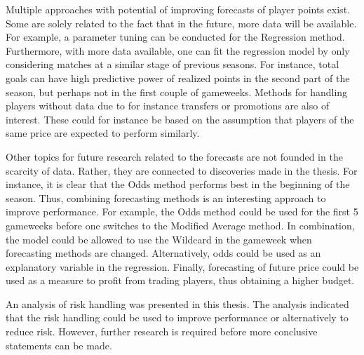 \newpar

Multiple approaches with potential of improving forecasts of player points exist. Some are solely related to the fact that in the future, more data will be available. For example, a parameter tuning can be conducted for the Regression method. Furthermore, with more data available, one can fit the regression model by only considering matches at a similar stage of previous seasons. For instance, total goals can have high predictive power of realized points in the second part of the season, but perhaps not in the first couple of gameweeks. Methods for handling players without data due to for instance transfers or promotions are also of interest. These could for instance be based on the assumption that players of the same price are expected to perform similarly.

\newpar

Other topics for future research related to the forecasts are not founded in the scarcity of data. Rather, they are connected to discoveries made in the thesis. For instance, it is clear that the Odds method performs best in the beginning of the season. Thus, combining forecasting methods is an interesting approach to improve performance. For example, the Odds method could be used for the first 5 gameweeks before one switches to the Modified Average method. In combination, the model could be allowed to use the Wildcard in the gameweek when forecasting methods are changed. Alternatively, odds could be used as an explanatory variable in the regression. Finally, forecasting of future price could be used as a measure to profit from trading players, thus obtaining a higher budget.

\newpar

An analysis of risk handling was presented in this thesis. The analysis indicated that the risk handling could be used to improve performance or alternatively to reduce risk. However, further research is required before more conclusive statements can be made. 

